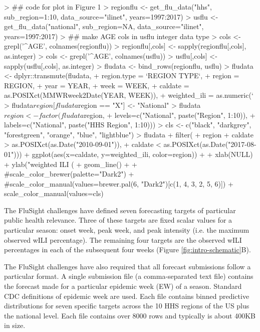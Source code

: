 \documentclass{article}
\begin{document}
\begin{Schunk}
\begin{Sinput}
> ## code for plot in Figure 1
> regionflu <- get_flu_data("hhs", sub_region=1:10, data_source="ilinet", years=1997:2017)
> usflu <- get_flu_data("national", sub_region=NA, data_source="ilinet", years=1997:2017)
> ## make AGE cols in usflu integer data type
> cols <- grepl('^AGE', colnames(regionflu))
> regionflu[,cols] <- sapply(regionflu[,cols], as.integer)
> cols <- grepl('^AGE', colnames(usflu))
> usflu[,cols] <- sapply(usflu[,cols], as.integer)
> fludata <- bind_rows(regionflu, usflu)
> fludata <- dplyr::transmute(fludata,
+     region.type = `REGION TYPE`,
+     region = REGION,
+     year = YEAR,
+     week = WEEK,
+     caldate = as.POSIXct(MMWRweek2Date(YEAR, WEEK)),
+     weighted_ili = as.numeric(`%
> fludata$region[fludata$region == "X"] <- "National"
> fludata$region <- factor(fludata$region, 
+     levels=c("National", paste("Region", 1:10)),
+     labels=c("National", paste("HHS Region", 1:10)))
> cls <- c("black", "darkgrey", "forestgreen", "orange", "blue", "lightblue")
> fludata %
+     filter(
+         region %
+         caldate > as.POSIXct(as.Date("2010-09-01")),
+         caldate < as.POSIXct(as.Date("2017-08-01"))) %
+     ggplot(aes(x=caldate, y=weighted_ili, color=region)) + 
+     xlab(NULL) + ylab("weighted ILI (%
+     geom_line() +
+     #scale_color_brewer(palette="Dark2")
+     #scale_color_manual(values=brewer.pal(6, "Dark2")[c(1, 4, 3, 2, 5, 6)])
+     scale_color_manual(values=cls)
\end{Sinput}
\end{Schunk}


The FluSight challenges have defined seven forecasting targets of particular public health relevance. Three of these targets are fixed scalar values for a particular season: onset week, peak week, and peak intensity (i.e. the maximum observed wILI percentage). The remaining four targets are the observed wILI percentages in each of the subsequent four weeks (Figure \ref{fig:intro-schematic}B). 

The FluSight challenges have also required that all forecast submissions follow a particular format. A single submission file (a comma-separated text file) contains the forecast made for a particular epidemic week (EW) of a season. Standard CDC definitions of epidemic week are used. Each file contains binned predictive distributions for seven specific targets across the 10 HHS regions of the US plus the national level. Each file contains over 8000 rows and typically is about 400KB in size.
\end{document}
